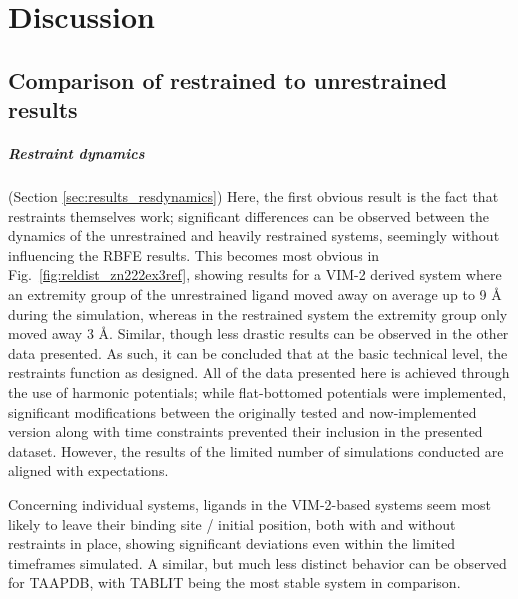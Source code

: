 \documentclass[oneside]{scrreprt}
\begin{document}
\chapter{Discussion}

\section{Comparison of restrained to unrestrained results}
\paragraph{Restraint dynamics} (Section \ref{sec:results_resdynamics}) Here, the first obvious result is the fact that restraints themselves work; significant differences can be observed between the dynamics of the unrestrained and heavily restrained systems, seemingly without influencing the RBFE results. This becomes most obvious in Fig.~\ref{fig:reldist_zn222ex3ref}, showing results for a VIM-2 derived system where an extremity group of the unrestrained ligand moved away on average up to 9 {\AA}  during the simulation, whereas in the restrained system the extremity group only moved away 3 {\AA}. Similar, though less drastic results can be observed in the other data presented. As such, it can be concluded that at the basic technical level, the restraints function as designed. All of the data presented here is achieved through the use of harmonic potentials; while flat-bottomed potentials were implemented, significant modifications between the originally tested and now-implemented version along with time constraints prevented their inclusion in the presented dataset. However, the results of the limited number of simulations conducted are aligned with expectations.

Concerning individual systems, ligands in the VIM-2-based systems seem most likely to leave their binding site / initial position, both with and without restraints in place, showing significant deviations even within the limited timeframes simulated. A similar, but much less distinct behavior can be observed for TAAPDB, with TABLIT being the most stable system in comparison.
\end{document}
